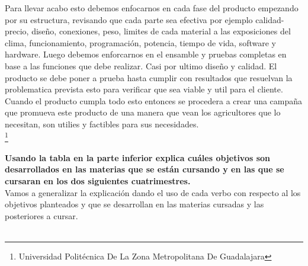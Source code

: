 \documentclass[11pt,a4paper]{article}
\begin{document}
Para llevar acabo esto debemos enfocarnos en cada fase del producto empezando por su estructura, revisando que cada parte sea efectiva por ejemplo calidad-precio, diseño, conexiones, peso, limites de cada material a las exposiciones del clima, funcionamiento, programación, potencia, tiempo de vida, software y hardware. Luego debemos enforcarnos en el ensamble y pruebas completas en base a las funciones que debe realizar. Casi por ultimo diseño y calidad. El producto se debe poner a prueba hasta cumplir con resultados que resuelvan la problematica prevista esto para verificar que sea viable y util para el cliente. Cuando el producto cumpla todo esto entonces se procedera a crear una campaña que promueva este producto de una manera que vean los agricultores que lo necesitan, son utilies y factibles para sus necesidades.\\

\footnote{Universidad Politécnica De La Zona Metropolitana De Guadalajara} 

\newpage


\textbf{Usando la tabla en la parte inferior explica cuáles objetivos son desarrollados en las materias que se están cursando y en las que se cursaran en los dos siguientes cuatrimestres.}\\
Vamos a generalizar la explicación dando el uso de cada verbo con respecto al los objetivos planteados y que se desarrollan en las materias cursadas y las posteriores a cursar.\\\\
\end{document}
